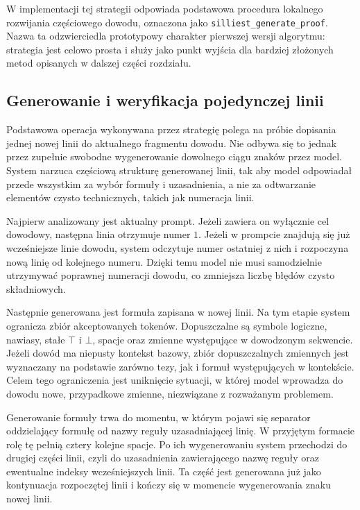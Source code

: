\documentclass[shortabstract]{iithesis}
\theoremstyle{definition}
\theoremstyle{remark}
\theoremstyle{plain}
\begin{document}
W implementacji tej strategii odpowiada podstawowa procedura lokalnego rozwijania
częściowego dowodu, oznaczona jako \texttt{silliest\_generate\_proof}. Nazwa ta
odzwierciedla prototypowy charakter pierwszej wersji algorytmu: strategia jest
celowo prosta i służy jako punkt wyjścia dla bardziej złożonych metod opisanych
w dalszej części rozdziału.


\subsection{Generowanie i weryfikacja pojedynczej linii}

Podstawowa operacja wykonywana przez strategię polega na próbie dopisania jednej
nowej linii do aktualnego fragmentu dowodu. Nie odbywa się to jednak przez zupełnie
swobodne wygenerowanie dowolnego ciągu znaków przez model. System narzuca
częściową strukturę generowanej linii, tak aby model odpowiadał przede wszystkim
za wybór formuły i uzasadnienia, a nie za odtwarzanie elementów czysto technicznych,
takich jak numeracja linii.

Najpierw analizowany jest aktualny prompt. Jeżeli zawiera on wyłącznie cel dowodowy,
następna linia otrzymuje numer \(1\). Jeżeli w prompcie znajdują się już wcześniejsze
linie dowodu, system odczytuje numer ostatniej z nich i rozpoczyna nową linię od
kolejnego numeru. Dzięki temu model nie musi samodzielnie utrzymywać poprawnej
numeracji dowodu, co zmniejsza liczbę błędów czysto składniowych.

Następnie generowana jest formuła zapisana w nowej linii. Na tym etapie system
ogranicza zbiór akceptowanych tokenów. Dopuszczalne są symbole logiczne, nawiasy,
stałe \(\top\) i \(\bot\), spacje oraz zmienne występujące w dowodzonym sekwencie.
Jeżeli dowód ma niepusty kontekst bazowy, zbiór dopuszczalnych zmiennych jest
wyznaczany na podstawie zarówno tezy, jak i formuł występujących w kontekście.
Celem tego ograniczenia jest uniknięcie sytuacji, w której model wprowadza do
dowodu nowe, przypadkowe zmienne, niezwiązane z rozważanym problemem.

Generowanie formuły trwa do momentu, w którym pojawi się separator oddzielający
formułę od nazwy reguły uzasadniającej linię. W przyjętym formacie rolę tę pełnią cztery kolejne
spacje. Po ich wygenerowaniu system przechodzi do drugiej części linii, czyli do
uzasadnienia zawierającego nazwę reguły oraz ewentualne indeksy wcześniejszych
linii. Ta część jest generowana już jako kontynuacja rozpoczętej linii i kończy się
w momencie wygenerowania znaku nowej linii.
\end{document}

